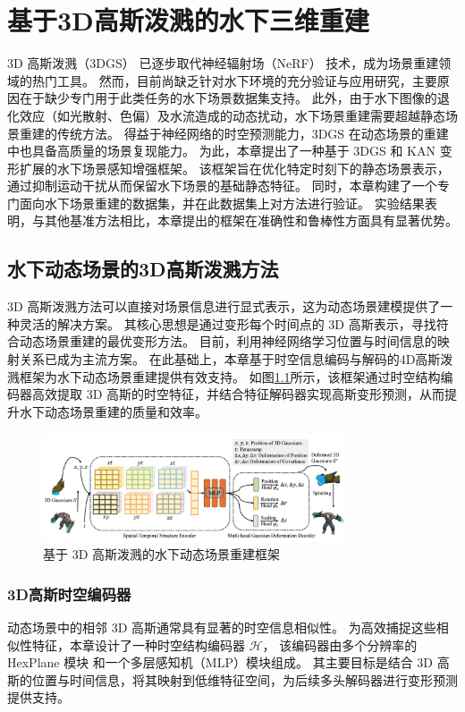 
\chapter{基于3D高斯泼溅的水下三维重建}
3D 高斯泼溅（3DGS）\cite{3DGS} 已逐步取代神经辐射场（NeRF）\cite{nerf} 技术，成为场景重建领域的热门工具。
然而，目前尚缺乏针对水下环境的充分验证与应用研究，主要原因在于缺少专门用于此类任务的水下场景数据集支持。
此外，由于水下图像的退化效应（如光散射、色偏）及水流造成的动态扰动，水下场景重建需要超越静态场景重建的传统方法。
得益于神经网络的时空预测能力，3DGS 在动态场景的重建中也具备高质量的场景复现能力。
为此，本章提出了一种基于 3DGS 和 KAN \cite{kan}变形扩展的水下场景感知增强框架。
该框架旨在优化特定时刻下的静态场景表示，通过抑制运动干扰从而保留水下场景的基础静态特征。
同时，本章构建了一个专门面向水下场景重建的数据集，并在此数据集上对方法进行验证。
实验结果表明，与其他基准方法相比，本章提出的框架在准确性和鲁棒性方面具有显著优势。

\section{水下动态场景的3D高斯泼溅方法}
3D 高斯泼溅方法可以直接对场景信息进行显式表示，这为动态场景建模提供了一种灵活的解决方案。
其核心思想是通过变形每个时间点的 3D 高斯表示，寻找符合动态场景重建的最优变形方法。
目前，利用神经网络学习位置与时间信息的映射关系已成为主流方案。
在此基础上，本章基于时空信息编码与解码的4D高斯泼溅\cite{4DGS}框架为水下动态场景重建提供有效支持。
如图\ref{img:4dgs}所示，该框架通过时空结构编码器高效提取 3D 高斯的时空特征，并结合特征解码器实现高斯变形预测，从而提升水下动态场景重建的质量和效率。
\begin{figure}[htbp]
    \centering
    \includegraphics[width=0.8\textwidth]{figures/ch4/4dgs.jpg}
    \caption{基于 3D 高斯泼溅的水下动态场景重建框架}
    \label{img:4dgs}
\end{figure}

\subsection{3D高斯时空编码器}
动态场景中的相邻 3D 高斯通常具有显著的时空信息相似性。
为高效捕捉这些相似性特征，本章设计了一种时空结构编码器 $\mathcal{H}$，
该编码器由多个分辨率的 HexPlane 模块\cite{hex_plane} 和一个多层感知机（MLP）模块组成。
其主要目标是结合 3D 高斯的位置与时间信息，将其映射到低维特征空间，为后续多头解码器进行变形预测提供支持。

